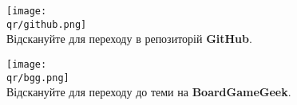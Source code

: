 \bigbreak

\begin{multicols}{2}
\centering
\texttt{[image: \\qr/github.png]}\\
Відскануйте для переходу в репозиторій \textbf{GitHub}.

\columnbreak

\texttt{[image: \\qr/bgg.png]}\\
Відскануйте для переходу до теми на \textbf{BoardGameGeek}.
\end{multicols}
